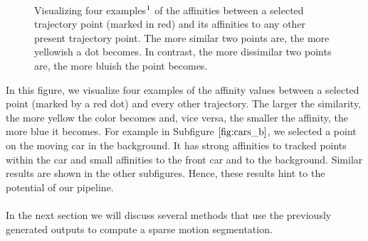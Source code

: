 \begin{figure}[H]
\begin{center}
~
\end{center}
\caption[Trajectory Affinities Example]{Visualizing four examples$\footnotemark$ of the affinities between a selected trajectory point (marked in red) and its affinities to any other present trajectory point. The more similar two points are, the more yellowish a dot becomes. In contrast, the more dissimilar two points are, the more bluish the point becomes.}
\label{fig:cars_affinities}
\end{figure}
In this figure, we visualize four examples of the affinity values between a selected point (marked by a red dot) and every other trajectory. The larger the similarity, the more yellow the color becomes and, vice versa, the smaller the affinity, the more blue it becomes. For example in Subfigure $\ref{fig:cars_b}$, we selected a point on the moving car in the background. It has strong affinities to tracked points within the car and small affinities to the front car and to the background. Similar results are shown in the other subfigures. Hence, these results hint to the potential of our pipeline. \\ \\
In the next section we will discuss several methods that use the previously generated outputs to compute a sparse motion segmentation.


